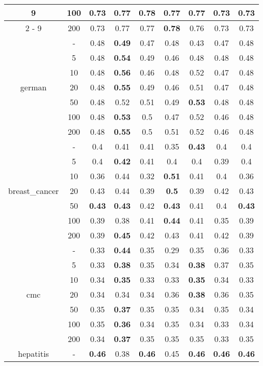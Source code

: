 \documentclass{article}%
\begin{document}
\begin{longtable}{c|c|ccccccc}
{9}%
&100&0.73&0.77&\textbf{0.78}&0.77&0.77&0.73&0.73\\%
\cline{2%
-%
9}%
&200&0.73&0.77&0.77&\textbf{0.78}&0.76&0.73&0.73\\%
\hline%
\multirow{7}{*}{german}&{-}&0.48&\textbf{0.49}&0.47&0.48&0.43&0.47&0.48\\%
\cline{2%
-%
9}%
&5&0.48&\textbf{0.54}&0.49&0.46&0.48&0.48&0.48\\%
\cline{2%
-%
9}%
&10&0.48&\textbf{0.56}&0.46&0.48&0.52&0.47&0.48\\%
\cline{2%
-%
9}%
&20&0.48&\textbf{0.55}&0.49&0.46&0.51&0.47&0.48\\%
\cline{2%
-%
9}%
&50&0.48&0.52&0.51&0.49&\textbf{0.53}&0.48&0.48\\%
\cline{2%
-%
9}%
&100&0.48&\textbf{0.53}&0.5&0.47&0.52&0.46&0.48\\%
\cline{2%
-%
9}%
&200&0.48&\textbf{0.55}&0.5&0.51&0.52&0.46&0.48\\%
\hline%
\multirow{7}{*}{breast\_cancer}&{-}&0.4&0.41&0.41&0.35&\textbf{0.43}&0.4&0.4\\%
\cline{2%
-%
9}%
&5&0.4&\textbf{0.42}&0.41&0.4&0.4&0.39&0.4\\%
\cline{2%
-%
9}%
&10&0.36&0.44&0.32&\textbf{0.51}&0.41&0.4&0.36\\%
\cline{2%
-%
9}%
&20&0.43&0.44&0.39&\textbf{0.5}&0.39&0.42&0.43\\%
\cline{2%
-%
9}%
&50&\textbf{0.43}&\textbf{0.43}&0.42&\textbf{0.43}&0.41&0.4&\textbf{0.43}\\%
\cline{2%
-%
9}%
&100&0.39&0.38&0.41&\textbf{0.44}&0.41&0.35&0.39\\%
\cline{2%
-%
9}%
&200&0.39&\textbf{0.45}&0.42&0.43&0.41&0.42&0.39\\%
\hline%
\multirow{7}{*}{cmc}&{-}&0.33&\textbf{0.44}&0.35&0.29&0.35&0.36&0.33\\%
\cline{2%
-%
9}%
&5&0.33&\textbf{0.38}&0.35&0.34&\textbf{0.38}&0.37&0.35\\%
\cline{2%
-%
9}%
&10&0.34&\textbf{0.35}&0.33&0.33&\textbf{0.35}&0.34&0.33\\%
\cline{2%
-%
9}%
&20&0.34&0.34&0.34&0.36&\textbf{0.38}&0.36&0.35\\%
\cline{2%
-%
9}%
&50&0.35&\textbf{0.37}&0.35&0.35&0.34&0.35&0.34\\%
\cline{2%
-%
9}%
&100&0.35&\textbf{0.36}&0.34&0.35&0.34&0.33&0.34\\%
\cline{2%
-%
9}%
&200&0.34&\textbf{0.37}&0.35&0.35&0.35&0.33&0.35\\%
\hline%
\multirow{7}{*}{hepatitis}&{-}&\textbf{0.46}&0.38&\textbf{0.46}&0.45&\textbf{0.46}&\textbf{0.46}&\textbf{0.46}\\%

\end{longtable}
\end{document}
